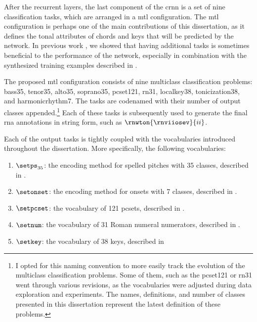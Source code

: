 
After the recurrent layers, the last component of the
\gls{crnn} is a set of nine classification tasks, which are
arranged in a \gls{mtl} configuration. The \gls{mtl}
configuration is perhaps one of the main contributions of
this dissertation, as it defines the tonal attributes of
chords and keys that will be predicted by the network. In
previous work \parencite{napoleslopez2021augmentednet}, we
showed that having additional tasks is sometimes beneficial
to the performance of the network, especially in combination
with the synthesized training examples described in
.

The proposed \gls{mtl} configuration consists of nine
multiclass classification problems: \gls{bass35},
\gls{tenor35}, \gls{alto35}, \gls{soprano35},
\gls{pcset121}, \gls{rn31}, \gls{localkey38},
\gls{tonicization38}, and \gls{harmonicrhythm7}. The tasks
are codenamed with their number of output classes
appended.\footnote{I opted for this naming convention to
more easily track the evolution of the multiclass
classification problems. Some of them, such as the
\gls{pcset121} or \gls{rn31} went through various revisions,
as the vocabularies were adjusted during data exploration
and experiments. The names, definitions, and number of
classes presented in this dissertation represent the latest
definition of these problems.} Each of these tasks is
subsequently used to generate the final \gls{rna}
annotations in string form, such as
$\rnwton{\rnviiosev}{ii}$.

Each of the output tasks is tightly coupled with the
vocabularies introduced throughout the dissertation. More
specifically, the following vocabularies:

\begin{enumerate}
    \item $\setps_{35}$: the encoding method for spelled
    pitches with 35 classes, described in
    .
    \item $\setonset$: the encoding method for onsets with 7
    classes, described in
    .
    \item $\setpcset$: the vocabulary of 121 \gls{pcset}s,
    described in .
    \item $\setnum$: the vocabulary of 31 Roman numeral
    numerators, described in
    .
    \item $\setkey$: the vocabulary of 38 keys, described in
\end{enumerate}
